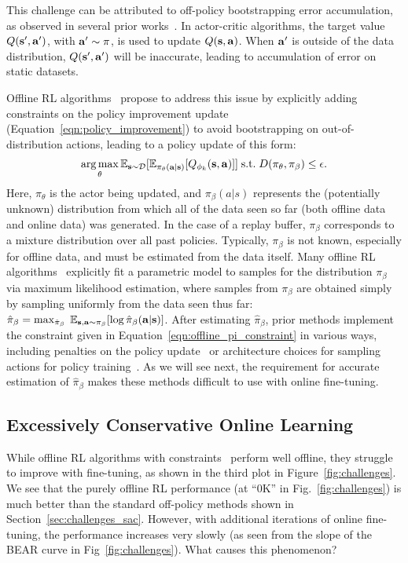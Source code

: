\documentclass[conference]{IEEEtran}
\begin{document}
This challenge can be attributed to off-policy bootstrapping error accumulation, as observed in several prior works~\citep{sutton1998rl, kumar19bear, wu2019brac, levine2020offlinetutorial, fujimoto19bcq}.
In actor-critic algorithms, the target value $Q(\mathbf{s}', \mathbf{a}')$, with $\mathbf{a}' \sim \pi$, is used to update $Q(\mathbf{s}, \mathbf{a})$. When $\mathbf{a}'$ is outside of the data distribution, $Q(\mathbf{s}', \mathbf{a}')$ will be inaccurate, leading to accumulation of error on static datasets. 

Offline RL algorithms~\citep{fujimoto19bcq, kumar19bear, wu2019brac} propose to address this issue by explicitly adding constraints on the policy improvement update (Equation~\ref{eqn:policy_improvement}) to avoid bootstrapping on out-of-distribution actions, leading to a policy update of this form:
\begin{align} \label{eqn:offline_pi_constraint}
    \argmax_{\theta} \E_{\st \sim \mathcal{D}}[\E_{\pi_\theta(\at|\st)}[Q_{\phi_k}(\st,\at)]] \; \text{s.t.} \; D(\pi_\theta, \pi_\beta) \leq \epsilon.
\end{align}
Here, $\pi_\theta$ is the actor being updated, and $\pi_\beta(a|s)$ represents the (potentially unknown) distribution from which all of the data seen so far (both offline data and online data) was generated. In the case of a replay buffer, $\pi_\beta$ corresponds to a mixture distribution over all past policies. Typically, $\pi_\beta$ is not known, especially for offline data, and must be estimated from the data itself. Many offline RL algorithms~\citep{kumar19bear, fujimoto19bcq, siegel2020abm} explicitly fit a parametric model to samples for the distribution $\pi_\beta$ via maximum likelihood estimation, where samples from $\pi_\beta$ are obtained simply by sampling uniformly from the data seen thus far:
$
    \hat{\pi}_\beta = \max_{\hat{\pi}_\beta} \; \mathbb{E}_{\mathbf{s}, \mathbf{a} \sim \pi_\beta}[\log \hat{\pi}_\beta(\mathbf{a}|\mathbf{s})]
$.
After estimating $\hat{\pi}_\beta$, prior methods implement the constraint given in Equation~\ref{eqn:offline_pi_constraint} in various ways, including penalties on the policy update~\citep{kumar19bear,wu2019brac} or architecture choices for sampling actions for policy training~\citep{fujimoto19bcq,siegel2020abm}. As we will see next, the requirement for accurate estimation of $\hat{\pi}_\beta$ makes these methods difficult to use with online fine-tuning.

\subsection{Excessively Conservative Online Learning} \label{sec:challenges_bear}
While offline RL algorithms with constraints~\citep{kumar19bear, fujimoto19bcq, wu2019brac} perform well offline, they struggle to improve with fine-tuning, as shown in the third plot in Figure~\ref{fig:challenges}. We see that the purely offline RL performance (at ``0K'' in Fig.~\ref{fig:challenges}) is much better than the standard off-policy methods shown in Section~\ref{sec:challenges_sac}. However, with additional iterations of online fine-tuning, the performance increases very slowly (as seen from the slope of the BEAR curve in Fig~\ref{fig:challenges}). What causes this phenomenon? 
\end{document}
